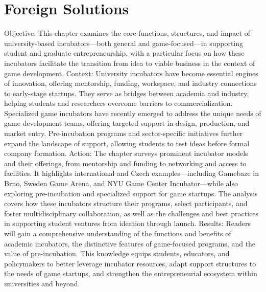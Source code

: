 \chapter{Foreign Solutions}

\begin{chapterabstract}
    Objective:
    This chapter examines the core functions, structures, and impact of university-based incubators—both general and game-focused—in supporting student and graduate entrepreneurship, with a particular focus on how these incubators facilitate the transition from idea to viable business in the context of game development.
    Context:
    University incubators have become essential engines of innovation, offering mentorship, funding, workspace, and industry connections to early-stage startups. They serve as bridges between academia and industry, helping students and researchers overcome barriers to commercialization. Specialized game incubators have recently emerged to address the unique needs of game development teams, offering targeted support in design, production, and market entry. Pre-incubation programs and sector-specific initiatives further expand the landscape of support, allowing students to test ideas before formal company formation.
    Action:
    The chapter surveys prominent incubator models and their offerings, from mentorship and funding to networking and access to facilities. It highlights international and Czech examples—including Gamebaze in Brno, Sweden Game Arena, and NYU Game Center Incubator—while also exploring pre-incubation and specialized support for game startups. The analysis covers how these incubators structure their programs, select participants, and foster multidisciplinary collaboration, as well as the challenges and best practices in supporting student ventures from ideation through launch.
    Results:
    Readers will gain a comprehensive understanding of the functions and benefits of academic incubators, the distinctive features of game-focused programs, and the value of pre-incubation. This knowledge equips students, educators, and policymakers to better leverage incubator resources, adapt support structures to the needs of game startups, and strengthen the entrepreneurial ecosystem within universities and beyond.
\end{chapterabstract}

